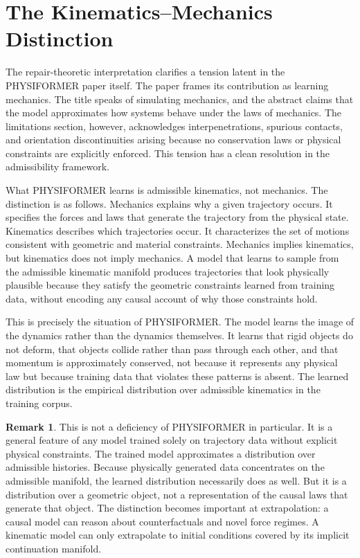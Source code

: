 \documentclass[12pt,oneside]{article}
\theoremstyle{definition}
\newtheorem{remark}[theorem]{Remark}
\begin{document}
\section{The Kinematics--Mechanics Distinction}

The repair-theoretic interpretation clarifies a tension latent in the PHYSIFORMER
paper itself. The paper frames its contribution as learning mechanics. The title
speaks of simulating mechanics, and the abstract claims that the model approximates
how systems behave under the laws of mechanics. The limitations section, however,
acknowledges interpenetrations, spurious contacts, and orientation discontinuities
arising because no conservation laws or physical constraints are explicitly enforced.
This tension has a clean resolution in the admissibility framework.

What PHYSIFORMER learns is admissible kinematics, not mechanics. The distinction is
as follows. Mechanics explains why a given trajectory occurs. It specifies the forces
and laws that generate the trajectory from the physical state. Kinematics describes
which trajectories occur. It characterizes the set of motions consistent with
geometric and material constraints. Mechanics implies kinematics, but kinematics
does not imply mechanics. A model that learns to sample from the admissible
kinematic manifold produces trajectories that look physically plausible because
they satisfy the geometric constraints learned from training data, without encoding
any causal account of why those constraints hold.

This is precisely the situation of PHYSIFORMER. The model learns the image of the
dynamics rather than the dynamics themselves. It learns that rigid objects do not
deform, that objects collide rather than pass through each other, and that momentum
is approximately conserved, not because it represents any physical law but because
training data that violates these patterns is absent. The learned distribution is
the empirical distribution over admissible kinematics in the training corpus.

\begin{remark}
This is not a deficiency of PHYSIFORMER in particular. It is a general feature of
any model trained solely on trajectory data without explicit physical constraints.
The trained model approximates a distribution over admissible histories. Because
physically generated data concentrates on the admissible manifold, the learned
distribution necessarily does as well. But it is a distribution over a geometric
object, not a representation of the causal laws that generate that object.
The distinction becomes important at extrapolation: a causal model can reason about
counterfactuals and novel force regimes. A kinematic model can only extrapolate to
initial conditions covered by its implicit continuation manifold.
\end{remark}
\end{document}
